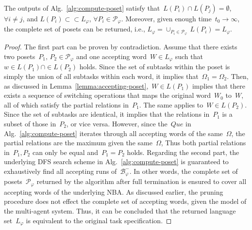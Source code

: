 \begin{lemma}\label{lemma:complete-poset}
The outputs of Alg.~\ref{alg:compute-poset}
satisfy that~$L(P_i)\cap L(P_j)=\emptyset$, $\forall i\neq j$,
and $L(P_i)\subset  \subset L_\varphi$, $\forall P_i \in \mathcal{P}_\varphi$.
Moreover, given enough time~$t_0\rightarrow \infty$,
the complete set of posets can be returned, i.e.,
$L_\varphi = \cup_{P_i\in \mathcal{P}_\varphi}\,L(P_i)=L_\varphi$.
\end{lemma}
\begin{proof}
The first part can be proven by contradiction.
 Assume that there exists two posets~$P_1,\,P_2\in \mathcal{P}_\varphi$
 and one accepting word~$W\in L_\varphi$ such that~$w\in L(P_1) \cap \in L(P_2)$ holds.
Since the set of subtasks within the poset is simply
 the union of all subtasks within each word,
 it implies that~$\Omega_1 = \Omega_2$.
 Then, as discussed in Lemma~\ref{lemma:accepting-poset},~$W\in L(P_1)$ implies
 that there exists a sequence of switching operations that maps the original
 word~$W_0$ to~$W$, all of which satisfy the partial relations in~$P_1$.
 The same applies to~$W\in L(P_2)$.
 Since the set of subtasks are identical, it implies that the relations in~$P_1$
 is a subset of those in~$P_2$, or vice versa.
 However, since the~$Que$ in Alg.~\ref{alg:compute-poset} iterates through all
 accepting words of the same~$\Omega$,
 the partial relations are the maximum given the same~$\Omega$,
 Thus both partial relations in~$P_1, P_2$ can only be equal and~$P_1=P_2$ holds.
Regarding the second part,
the underlying DFS search scheme in Alg.~\ref{alg:compute-poset} is guaranteed
 to exhaustively find all accepting runs of~$\mathcal{B}^-_{\varphi}$.
 In other words, the complete set of posets~$\mathcal{P}_{\varphi}$ returned
 by the algorithm after full termination is ensured to cover all
 accepting words of the underlying NBA.
 As discussed earlier, the pruning procedure does not effect
 the complete set of accepting words, given the model of the multi-agent system.
 Thus, it can be concluded that the returned language set~$L_\varphi$
 is equivalent to the original task specification.
\end{proof}

